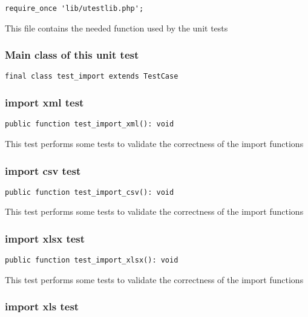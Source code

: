 \documentclass[a4paper]{article}
\begin{document}
\begin{lstlisting}
require_once 'lib/utestlib.php';
\end{lstlisting}

This file contains the needed function used by the unit tests

\hypertarget{toc228}{}
\subsubsection{Main class of this unit test}

\begin{lstlisting}
final class test_import extends TestCase
\end{lstlisting}

\hypertarget{toc229}{}
\subsubsection{import xml test}

\begin{lstlisting}
public function test_import_xml(): void
\end{lstlisting}

This test performs some tests to validate the correctness
of the import functions

\hypertarget{toc230}{}
\subsubsection{import csv test}

\begin{lstlisting}
public function test_import_csv(): void
\end{lstlisting}

This test performs some tests to validate the correctness
of the import functions

\hypertarget{toc231}{}
\subsubsection{import xlsx test}

\begin{lstlisting}
public function test_import_xlsx(): void
\end{lstlisting}

This test performs some tests to validate the correctness
of the import functions

\hypertarget{toc232}{}
\subsubsection{import xls test}
\end{document}
